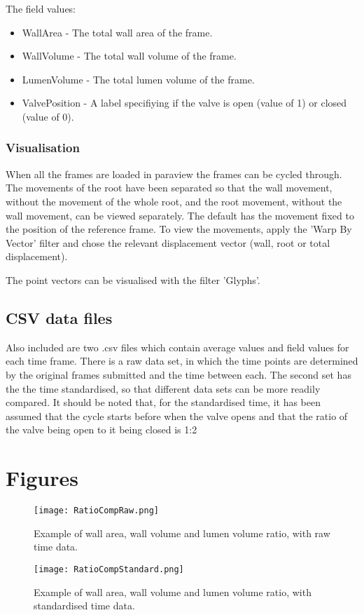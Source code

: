\documentclass{article}
\begin{document}
The field values:
\begin{itemize}
    \item WallArea - The total wall area of the frame.
    \item WallVolume - The total wall volume of the frame.
    \item LumenVolume - The total lumen volume of the frame.
    \item ValvePosition - A label specifiying if the valve is open (value of 1) or closed (value of 0).
\end{itemize}
\subsubsection*{Visualisation}
When all the frames are loaded in paraview the frames can be cycled through. The movements of the root have been separated so that the wall movement, without the movement of the whole root, and the root movement, without the wall movement, can be viewed separately. The default has the movement fixed to the position of the reference frame. To view the movements, apply the 'Warp By Vector' filter and chose the relevant displacement vector (wall, root or total displacement).

The point vectors can be visualised with the filter 'Glyphs'.

\subsection{CSV data files}
Also included are two .csv files which contain average values and field values for each time frame. There is a raw data set, in which the time points are determined by the original frames submitted and the time between each. The second set has the the time standardised, so that different data sets can be more readily compared. It should be noted that, for the standardised time, it has been assumed that the cycle starts before when the valve opens and that the ratio of the valve being open to it being closed is 1:2


\newpage
\section{Figures}

\begin{figure}[h!]
\centering
\texttt{[image: RatioCompRaw.png]}
\caption{Example of wall area, wall volume and lumen volume ratio, with raw time data.}
\end{figure}


\begin{figure}[h!]
\centering
\texttt{[image: RatioCompStandard.png]}
\caption{Example of wall area, wall volume and lumen volume ratio, with standardised time data.}
\end{figure}
\end{document}
